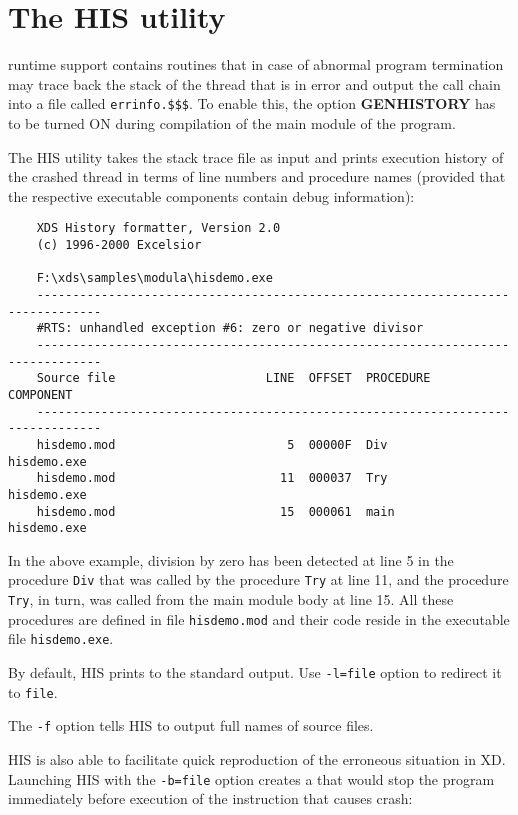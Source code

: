 \chapter{The HIS utility}
\label{his}

\XDS{} runtime support contains routines that in case of abnormal program
termination may trace back the stack of the thread that is in error and
output the call chain into a file called \verb'errinfo.$$$'. To enable this,
the option {\bf GENHISTORY} has to be turned ON during compilation of the main
module of the program. %

The HIS utility takes the stack trace file as input and prints execution history
of the crashed thread in terms of line numbers and procedure names (provided that
the respective executable components contain debug information):

{\footnotesize
\begin{verbatim}
    XDS History formatter, Version 2.0
    (c) 1996-2000 Excelsior
    
    F:\xds\samples\modula\hisdemo.exe
    -------------------------------------------------------------------------------
    #RTS: unhandled exception #6: zero or negative divisor
    -------------------------------------------------------------------------------
    Source file                     LINE  OFFSET  PROCEDURE        COMPONENT
    -------------------------------------------------------------------------------
    hisdemo.mod                        5  00000F  Div              hisdemo.exe
    hisdemo.mod                       11  000037  Try              hisdemo.exe
    hisdemo.mod                       15  000061  main             hisdemo.exe
\end{verbatim}
} %

In the above example, division by zero has been detected at line 5 in the
procedure \verb'Div' that was called by the procedure \verb'Try' at line 11, and the
procedure \verb'Try', in turn, was called from the main module body at line 15.
All these procedures are defined in file \verb'hisdemo.mod' and their code reside
in the executable file \verb'hisdemo.exe'.

By default, HIS prints to the standard output. Use \verb'-l=file' 
option to redirect it to \verb'file'.

The \verb'-f' option tells HIS to output full names of source files.

\pagebreak
HIS is also able to facilitate quick reproduction of the erroneous situation in XD.
Launching HIS with the \verb'-b=file' option creates a
that would stop the program immediately before execution of the instruction that
causes crash:

